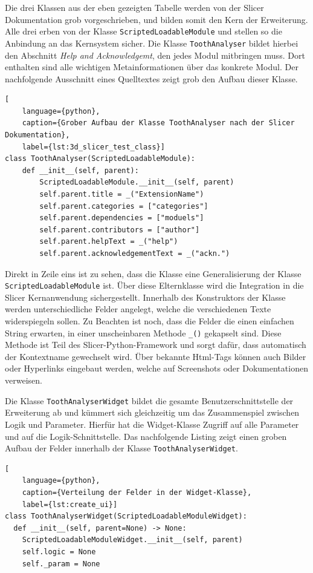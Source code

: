 Die drei Klassen aus der eben gezeigten Tabelle werden von der Slicer
Dokumentation grob vorgeschrieben, und bilden somit den Kern der Erweiterung.
Alle drei erben von der Klasse \texttt{ScriptedLoadableModule} und stellen so die
Anbindung an das Kernsystem sicher. Die Klasse \texttt{ToothAnalyser} bildet hierbei
den Abschnitt \textit{Help and Acknowledgemt}, den jedes Modul mitbringen muss.
Dort enthalten sind alle wichtigen Metainformationen über das konkrete Modul. Der
nachfolgende Ausschnitt eines Quelltextes zeigt grob den Aufbau dieser Klasse.

\begin{lstlisting}[
    language={python},
    caption={Grober Aufbau der Klasse ToothAnalyser nach der Slicer Dokumentation},
    label={lst:3d_slicer_test_class}]
class ToothAnalyser(ScriptedLoadableModule):
    def __init__(self, parent):
	    ScriptedLoadableModule.__init__(self, parent)
	    self.parent.title = _("ExtensionName")
	    self.parent.categories = ["categories"]
	    self.parent.dependencies = ["moduels"]
	    self.parent.contributors = ["author"]
	    self.parent.helpText = _("help")
	    self.parent.acknowledgementText = _("ackn.")
\end{lstlisting}

Direkt in Zeile eins ist zu sehen, dass die Klasse eine Generalisierung der Klasse
\texttt{ScriptedLoadableModule} ist. Über diese Elternklasse wird die Integration
in die Slicer Kernanwendung sichergestellt. Innerhalb des Konstruktors der
Klasse werden unterschiedliche Felder angelegt, welche die verschiedenen Texte widerspiegeln
sollen. Zu Beachten ist noch, dass die Felder die einen einfachen String erwarten,
in einer unscheinbaren Methode \texttt{\_()} gekapselt sind. Diese Methode ist
Teil des Slicer-Python-Framework und sorgt dafür, dass automatisch der Kontextname
gewechselt wird. Über bekannte Html-Tags können auch Bilder oder Hyperlinks
eingebaut werden, welche auf Screenshots oder Dokumentationen verweisen.

Die Klasse \texttt{ToothAnalyserWidget} bildet die gesamte Benutzerschnittstelle
der Erweiterung ab und kümmert sich gleichzeitig um das Zusammenspiel zwischen
Logik und Parameter. Hierfür hat die Widget-Klasse Zugriff auf alle Parameter und
auf die Logik-Schnittstelle. Das nachfolgende Listing zeigt einen groben Aufbau
der Felder innerhalb der Klasse \texttt{ToothAnalyserWidget}.

\begin{lstlisting}[
    language={python},
    caption={Verteilung der Felder in der Widget-Klasse},
    label={lst:create_ui}]
class ToothAnalyserWidget(ScriptedLoadableModuleWidget):
  def __init__(self, parent=None) -> None:
    ScriptedLoadableModuleWidget.__init__(self, parent)
    self.logic = None
    self._param = None
\end{lstlisting}


